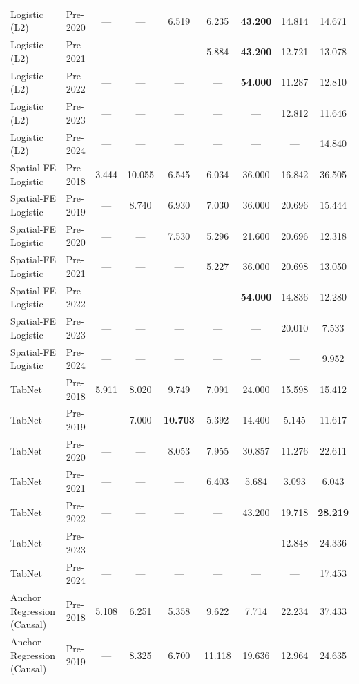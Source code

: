 \begin{table}[htbp]
{\begin{tabular}{l lccccccc}
Logistic (L2) & Pre-2020 & --- & --- & 6.519 & 6.235 & \textbf{43.200} & 14.814 & 14.671 \\
Logistic (L2) & Pre-2021 & --- & --- & --- & 5.884 & \textbf{43.200} & 12.721 & 13.078 \\
Logistic (L2) & Pre-2022 & --- & --- & --- & --- & \textbf{54.000} & 11.287 & 12.810 \\
Logistic (L2) & Pre-2023 & --- & --- & --- & --- & --- & 12.812 & 11.646 \\
Logistic (L2) & Pre-2024 & --- & --- & --- & --- & --- & --- & 14.840 \\
Spatial-FE Logistic & Pre-2018 & 3.444 & 10.055 & 6.545 & 6.034 & 36.000 & 16.842 & 36.505 \\
Spatial-FE Logistic & Pre-2019 & --- & 8.740 & 6.930 & 7.030 & 36.000 & 20.696 & 15.444 \\
Spatial-FE Logistic & Pre-2020 & --- & --- & 7.530 & 5.296 & 21.600 & 20.696 & 12.318 \\
Spatial-FE Logistic & Pre-2021 & --- & --- & --- & 5.227 & 36.000 & 20.698 & 13.050 \\
Spatial-FE Logistic & Pre-2022 & --- & --- & --- & --- & \textbf{54.000} & 14.836 & 12.280 \\
Spatial-FE Logistic & Pre-2023 & --- & --- & --- & --- & --- & 20.010 & 7.533 \\
Spatial-FE Logistic & Pre-2024 & --- & --- & --- & --- & --- & --- & 9.952 \\
TabNet & Pre-2018 & 5.911 & 8.020 & 9.749 & 7.091 & 24.000 & 15.598 & 15.412 \\
TabNet & Pre-2019 & --- & 7.000 & \textbf{10.703} & 5.392 & 14.400 & 5.145 & 11.617 \\
TabNet & Pre-2020 & --- & --- & 8.053 & 7.955 & 30.857 & 11.276 & 22.611 \\
TabNet & Pre-2021 & --- & --- & --- & 6.403 & 5.684 & 3.093 & 6.043 \\
TabNet & Pre-2022 & --- & --- & --- & --- & 43.200 & 19.718 & \textbf{28.219} \\
TabNet & Pre-2023 & --- & --- & --- & --- & --- & 12.848 & 24.336 \\
TabNet & Pre-2024 & --- & --- & --- & --- & --- & --- & 17.453 \\
Anchor Regression (Causal) & Pre-2018 & 5.108 & 6.251 & 5.358 & 9.622 & 7.714 & 22.234 & 37.433 \\
Anchor Regression (Causal) & Pre-2019 & --- & 8.325 & 6.700 & 11.118 & 19.636 & 12.964 & 24.635 \\

\end{tabular}}
\end{table}
